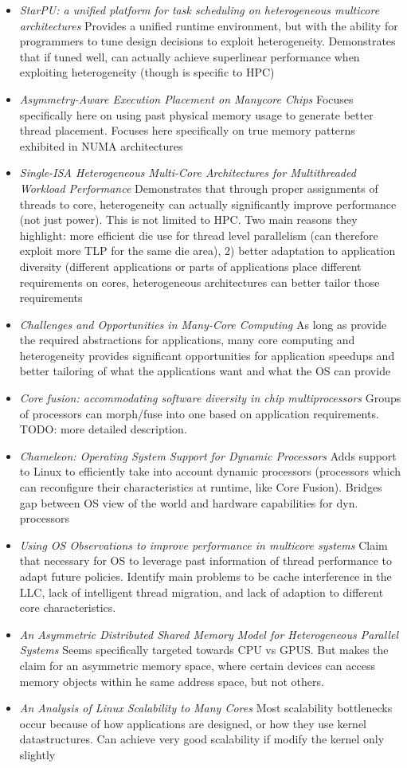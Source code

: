 \begin{itemize}
\item \emph{StarPU: a unified platform for task scheduling on heterogeneous
multicore architectures} Provides a unified runtime environment, but with the
ability for programmers to tune design decisions to exploit heterogeneity. Demonstrates
that if tuned well, can actually achieve superlinear performance when exploiting heterogeneity
(though is specific to HPC)
\item \emph{Asymmetry-Aware Execution Placement on Manycore Chips} Focuses
specifically here on using past physical memory usage to generate better thread
placement. Focuses here specifically on true memory patterns exhibited in 
NUMA architectures
\item \emph{Single-ISA Heterogeneous Multi-Core Architectures for Multithreaded Workload Performance}
Demonstrates that through proper assignments of threads to core, heterogeneity
can actually significantly improve performance (not just power). This is not
limited to HPC. Two main reasons they highlight: more efficient die use for thread
level parallelism (can therefore exploit more TLP for the same die area), 2)
better adaptation to application diversity (different applications or parts
of applications place
different requirements on cores, heterogeneous architectures can better
tailor those requirements
\item \emph{Challenges and Opportunities
in Many-Core Computing} As long as provide the required abstractions for applications, 
many core computing and heterogeneity provides significant opportunities for application
speedups and better tailoring of what the applications want and what the OS can provide
\item \emph{Core fusion: accommodating software diversity in chip multiprocessors}
Groups of processors can morph/fuse into one based on application requirements. 
TODO: more detailed description. 
\item \emph{Chameleon: Operating System Support for Dynamic Processors}
Adds support to Linux to efficiently take into account dynamic processors (processors
which can reconfigure their characteristics at runtime, like Core Fusion).
Bridges gap between OS view of the world and hardware capabilities for dyn.
processors
\item \emph{Using OS Observations to improve performance in multicore systems}
Claim that necessary for OS to leverage past information of thread performance
to adapt future policies. Identify main problems to be cache interference in the LLC,
lack of intelligent thread migration, and lack of adaption to different
core characteristics. 
\item \emph{An Asymmetric Distributed Shared Memory Model for Heterogeneous Parallel Systems}
Seems specifically targeted towards CPU vs GPUS. But makes the claim for an asymmetric
memory space, where certain devices can access memory objects within he same address space,
but not others. 
\item \emph{An Analysis of Linux Scalability to Many Cores} Most scalability bottlenecks
occur because of how applications are designed, or how they use kernel datastructures.
Can achieve very good scalability if modify the kernel only slightly 
\end{itemize}
